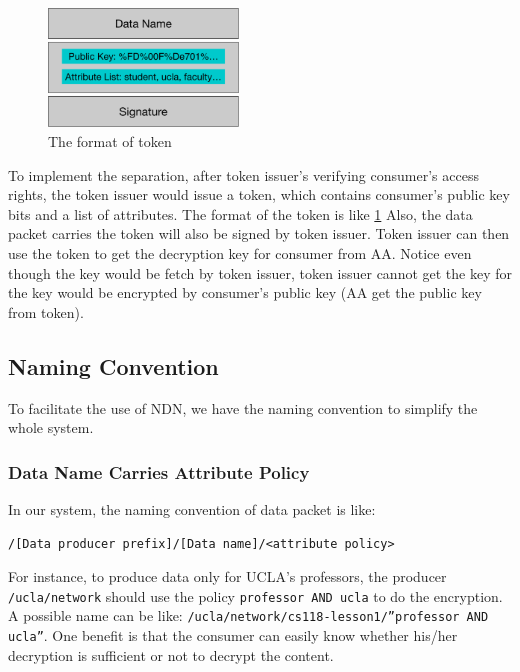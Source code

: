 \begin{figure}[h]
  \centering
  \includegraphics[width=0.45\textwidth]{figures/token}
  \vspace{-3mm}
  \caption{The format of token}
  \label{fig:token}
\end{figure}

To implement the separation, after token issuer's verifying consumer's access rights, the token issuer would issue a token, which contains consumer's public key bits and a list of attributes.
The format of the token is like \ref{fig:token}
Also, the data packet carries the token will also be signed by token issuer.
Token issuer can then use the token to get the decryption key for consumer from AA.
Notice even though the key would be fetch by token issuer, token issuer cannot get the key for the key would be encrypted by consumer's public key (AA get the public key from token).

\subsection{Naming Convention}

To facilitate the use of NDN, we have the naming convention to simplify the whole system.

\subsubsection{Data Name Carries Attribute Policy}

In our system, the naming convention of data packet is like:
\begin{verbatim}
/[Data producer prefix]/[Data name]/<attribute policy>
\end{verbatim}
For instance, to produce data only for UCLA's professors, the producer \texttt{/ucla/network} should use the policy \texttt{professor AND ucla} to do the encryption.
A possible name can be like: \texttt{/ucla/network/cs118-lesson1/''professor AND ucla''}.
One benefit is that the consumer can easily know whether his/her decryption is sufficient or not to decrypt the content.

